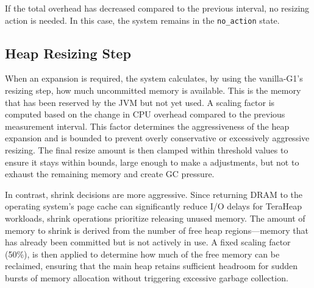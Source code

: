 If the total overhead has decreased compared to the previous interval, no resizing action is needed. In this case, 
the system remains in the \texttt{no\_action} state.
 
\subsection{Heap Resizing Step}

When an expansion is required, the system calculates, by using the vanilla-G1's resizing step, how much uncommitted
memory is available. This is the memory that has been reserved by the JVM but not yet used. 
A scaling factor is computed based on the change in CPU overhead compared to the previous 
measurement interval. This factor determines the aggressiveness of the heap expansion and 
is bounded to prevent overly conservative or excessively aggressive resizing. The final 
resize amount is then clamped within threshold values to ensure it stays within bounds, large enough to make 
a adjustments, but not to exhaust the remaining memory and create GC pressure.

In contrast, shrink decisions are more aggressive. Since returning 
DRAM to the operating system's page cache can significantly reduce I/O delays for TeraHeap
workloads, shrink operations prioritize releasing unused memory. The amount of memory to shrink 
is derived from the number of free heap regions—memory that has already been committed but is 
not actively in use. A fixed scaling factor (50\%), is then applied to determine how much 
of the free memory can be reclaimed, ensuring that the main heap retains sufficient headroom 
for sudden bursts of memory allocation without triggering excessive garbage collection.


